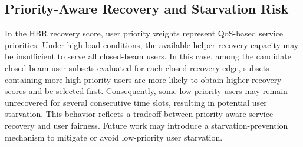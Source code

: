 \subsection{Priority-Aware Recovery and Starvation Risk}
\label{sec:discussion_priority_recovery}

In the HBR recovery score, user priority weights represent QoS-based service priorities. Under high-load conditions, the available helper recovery capacity may be insufficient to serve all closed-beam users. In this case, among the candidate closed-beam user subsets evaluated for each closed-recovery edge, subsets containing more high-priority users are more likely to obtain higher recovery scores and be selected first. Consequently, some low-priority users may remain unrecovered for several consecutive time slots, resulting in potential user starvation. This behavior reflects a tradeoff between priority-aware service recovery and user fairness. Future work may introduce a starvation-prevention mechanism to mitigate or avoid low-priority user starvation.